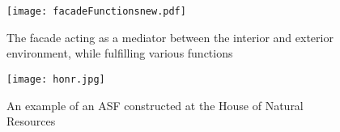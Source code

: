 
 





\begin{figure}
\begin{center}
\texttt{[image: facadeFunctionsnew.pdf]}
\caption{The facade acting as a mediator between the interior and exterior environment, while fulfilling various functions \cite{nagy2016adaptive}}
\label{fig:ASFschematic2}
\end{center}
\end{figure}

\begin{figure}
\begin{center}
\texttt{[image: honr.jpg]}
\caption{An example of an ASF constructed at the House of Natural Resources \cite{nagy2016adaptive}}
\label{fig:HoNR2}
\end{center}
\end{figure}




